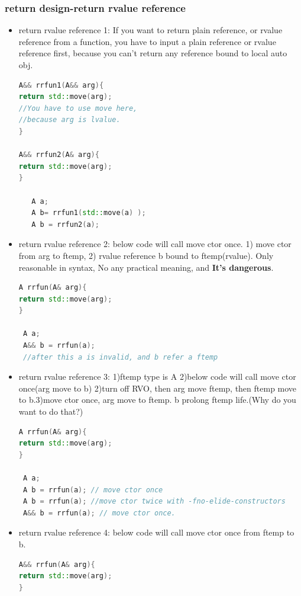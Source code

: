 \documentclass[a4paper,12pt,twoside]{book}
\begin{document}
\subsubsection{return design-return rvalue reference}
\begin{itemize}
\item return rvalue reference 1:   If you want to return plain reference, or rvalue reference from a function, you have to input a plain reference or rvalue reference first, because you can't return any reference bound to local auto obj.

\begin{lstlisting}[frame=single, language=c++]
A&& rrfun1(A&& arg){
return std::move(arg);
//You have to use move here,
//because arg is lvalue.
}

A&& rrfun2(A& arg){
return std::move(arg);
}

   A a;
   A b= rrfun1(std::move(a) );
   A b = rrfun2(a);
\end{lstlisting}


\item return rvalue reference 2:   below code will call move ctor once.  1) move ctor from arg to ftemp, 2) rvalue reference b bound to ftemp(rvalue). Only reasonable in syntax, No any practical meaning, and \textbf{It's dangerous}.
\begin{lstlisting}[frame=single, language=c++]
A rrfun(A& arg){
return std::move(arg);
}

 A a;
 A&& b = rrfun(a);
 //after this a is invalid, and b refer a ftemp
\end{lstlisting}

\item return rvalue reference 3:   1)ftemp type is A 2)below code will call move ctor once(arg move to b) 2)turn off RVO, then arg move ftemp, then ftemp move to b.3)move ctor once, arg move to ftemp. b prolong ftemp life.(Why do you want to do that?)
\begin{lstlisting}[frame=single, language=c++]
A rrfun(A& arg){
return std::move(arg);
}

 A a;
 A b = rrfun(a); // move ctor once
 A b = rrfun(a); //move ctor twice with -fno-elide-constructors
 A&& b = rrfun(a); // move ctor once.
\end{lstlisting}

\item return rvalue reference 4:   below code will call move ctor once from ftemp to b.  
\begin{lstlisting}[frame=single, language=c++]
A&& rrfun(A& arg){
return std::move(arg);
}


\end{lstlisting}
\end{itemize}
\end{document}
